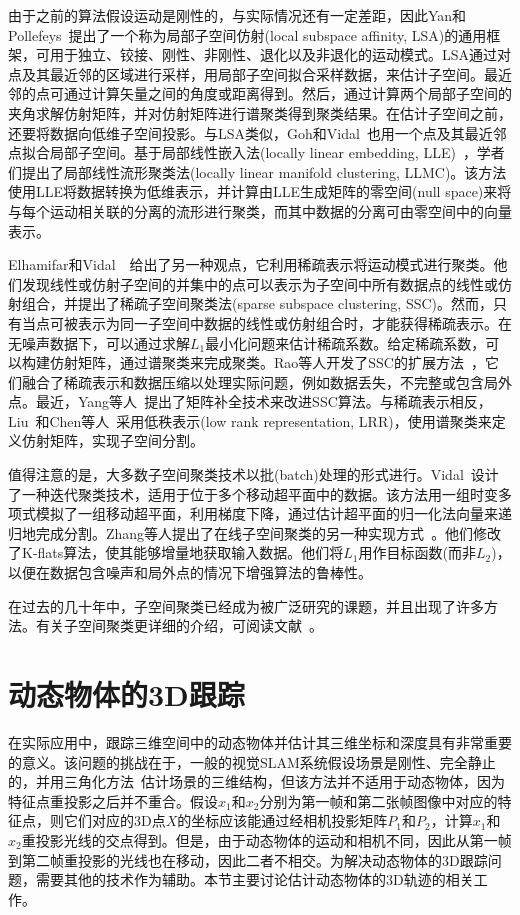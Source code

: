 由于之前的算法假设运动是刚性的，与实际情况还有一定差距，因此Yan和Pollefeys~\cite{yan2006general}提出了一个称为局部子空间仿射(local subspace affinity, LSA)的通用框架，可用于独立、铰接、刚性、非刚性、退化以及非退化的运动模式。LSA通过对点及其最近邻的区域进行采样，用局部子空间拟合采样数据，来估计子空间。最近邻的点可通过计算矢量之间的角度或距离得到。然后，通过计算两个局部子空间的夹角求解仿射矩阵，并对仿射矩阵进行谱聚类得到聚类结果。在估计子空间之前，还要将数据向低维子空间投影。与LSA类似，Goh和Vidal~\cite{goh2007segmenting}也用一个点及其最近邻点拟合局部子空间。基于局部线性嵌入法(locally linear embedding, LLE)~\cite{saul2003think}，学者们提出了局部线性流形聚类法(locally linear manifold clustering, LLMC)。该方法使用LLE将数据转换为低维表示，并计算由LLE生成矩阵的零空间(null space)来将与每个运动相关联的分离的流形进行聚类，而其中数据的分离可由零空间中的向量表示。

Elhamifar和Vidal~\cite{elhamifar2009sparse}~\cite{elhamifar2013sparse}给出了另一种观点，它利用稀疏表示将运动模式进行聚类。他们发现线性或仿射子空间的并集中的点可以表示为子空间中所有数据点的线性或仿射组合，并提出了稀疏子空间聚类法(sparse subspace clustering, SSC)。然而，只有当点可被表示为同一子空间中数据的线性或仿射组合时，才能获得稀疏表示。在无噪声数据下，可以通过求解$L_1$最小化问题来估计稀疏系数。给定稀疏系数，可以构建仿射矩阵，通过谱聚类来完成聚类。Rao等人开发了SSC的扩展方法~\cite{rao2009motion}，它们融合了稀疏表示和数据压缩以处理实际问题，例如数据丢失，不完整或包含局外点。最近，Yang等人~\cite{yang2015sparse}提出了矩阵补全技术来改进SSC算法。与稀疏表示相反，Liu~\cite{liu2012robust}和Chen等人~\cite{liu2010robust}采用低秩表示(low rank representation, LRR)，使用谱聚类来定义仿射矩阵，实现子空间分割。

值得注意的是，大多数子空间聚类技术以批(batch)处理的形式进行。Vidal~\cite{vidal2007online}设计了一种迭代聚类技术，适用于位于多个移动超平面中的数据。该方法用一组时变多项式模拟了一组移动超平面，利用梯度下降，通过估计超平面的归一化法向量来递归地完成分割。Zhang等人提出了在线子空间聚类的另一种实现方式~\cite{zhang2009median}。他们修改了K-flats算法，使其能够增量地获取输入数据。他们将$L_1$用作目标函数(而非$L_2$)，以便在数据包含噪声和局外点的情况下增强算法的鲁棒性。

在过去的几十年中，子空间聚类已经成为被广泛研究的课题，并且出现了许多方法。有关子空间聚类更详细的介绍，可阅读文献~\cite{vidal2011subspace}。

\section{动态物体的3D跟踪}
在实际应用中，跟踪三维空间中的动态物体并估计其三维坐标和深度具有非常重要的意义。该问题的挑战在于，一般的视觉SLAM系统假设场景是刚性、完全静止的，并用三角化方法~\cite{hartley1997triangulation}估计场景的三维结构，但该方法并不适用于动态物体，因为特征点重投影之后并不重合。假设$x_1$和$x_2$分别为第一帧和第二张帧图像中对应的特征点，则它们对应的3D点$X$的坐标应该能通过经相机投影矩阵$P_1$和$P_2$，计算$x_1$和$x_2$重投影光线的交点得到。但是，由于动态物体的运动和相机不同，因此从第一帧到第二帧重投影的光线也在移动，因此二者不相交。为解决动态物体的3D跟踪问题，需要其他的技术作为辅助。本节主要讨论估计动态物体的3D轨迹的相关工作。

